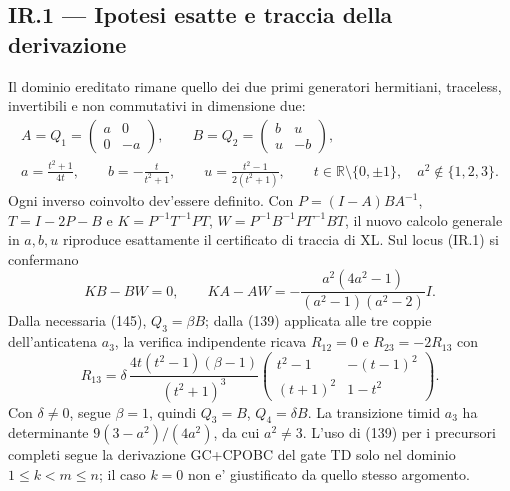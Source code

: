\documentclass[11pt,a4paper]{article}
\begin{document}
\subsection*{IR.1 --- Ipotesi esatte e traccia della derivazione}
Il dominio ereditato rimane quello dei due primi generatori hermitiani, traceless, invertibili e non commutativi in dimensione due:
\begin{equation}
\begin{gathered}
 A=Q_1=\begin{pmatrix}a&0\\0&-a\end{pmatrix},\qquad
 B=Q_2=\begin{pmatrix}b&u\\u&-b\end{pmatrix},\\[-2pt]
 a=\frac{t^2+1}{4t},\qquad b=-\frac{t}{t^2+1},\qquad
 u=\frac{t^2-1}{2(t^2+1)},\qquad
 t\in\mathbb R\setminus\{0,\pm1\},\quad a^2\notin\{1,2,3\}.
\end{gathered}\tag{IR.1}
\end{equation}
Ogni inverso coinvolto dev'essere definito. Con $P=(I-A)BA^{-1}$, $T=I-2P-B$ e $K=P^{-1}T^{-1}PT$, $W=P^{-1}B^{-1}PT^{-1}BT$, il nuovo calcolo generale in $a,b,u$ riproduce esattamente il certificato di traccia di XL. Sul locus (IR.1) si confermano
\begin{equation}
 KB-BW=0,\qquad KA-AW=-\frac{a^2(4a^2-1)}{(a^2-1)(a^2-2)}I.\tag{IR.2}
\end{equation}
Dalla necessaria (145), $Q_3=\beta B$; dalla (139) applicata alle tre coppie dell'anticatena $a_3$, la verifica indipendente ricava $R_{12}=0$ e $R_{23}=-2R_{13}$ con
\begin{equation}
R_{13}=\delta\,\frac{4t(t^2-1)(\beta-1)}{(t^2+1)^3}
\begin{pmatrix}t^2-1&-(t-1)^2\\(t+1)^2&1-t^2\end{pmatrix}.\tag{IR.3}
\end{equation}
Con $\delta\ne0$, segue $\beta=1$, quindi $Q_3=B$, $Q_4=\delta B$. La transizione timid $a_3$ ha determinante $9(3-a^2)/(4a^2)$, da cui $a^2\ne3$. L'uso di (139) per i precursori completi segue la derivazione GC+CPOBC del gate TD solo nel dominio $1\le k<m\le n$; il caso $k=0$ non e' giustificato da quello stesso argomento.
\end{document}
